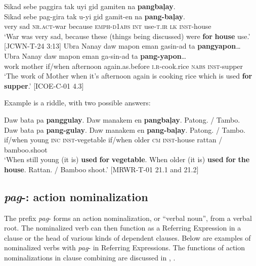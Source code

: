 \largerpage
\ea
Sikad  sebe  paggira  tak  uyi  gid  gamiten  na  \textbf{pangbaļay}. \\\smallskip
 \gll Sikad  sebe  pag-gira  tak  u-yi  gid  gamit-en  na  \textbf{pang-baļay}. \\
very  sad  \textsc{nr.act}-war  because  \textsc{emph}-\textsc{d}1\textsc{abs}  \textsc{int}  use-\textsc{t.ir}  \textsc{lk}  \textsc{inst}-house \\
\glt ‘War was very sad, because these (things being discussed) were \textbf{for} \textbf{house} use.’ [JCWN-T-24 3:13]
\z
\ea
Ubra  Nanay  daw  mapon  eman  gasin-ad ta  \textbf{pangyapon}… \\\smallskip
 \gll Ubra  Nanay  daw  mapon  eman  ga-sin-ad ta  \textbf{pang-yapon}… \\
work  mother  if/when  afternoon  again.as.before  \textsc{i.r}-cook.rice \textsc{nabs}  \textsc{inst}-supper \\
\glt `The work of Mother when it’s afternoon again is cooking rice which is used \textbf{for} \textbf{supper}.’ [ICOE-C-01 4.3]
\z

Example  is a riddle, with two possible answers:

\ea
\label{bkm:Ref447638230}
Daw  bata  pa  \textbf{panggulay}.  Daw  manakem  en  \textbf{pangbaļay}. Patong. /   Tambo. \\\smallskip
 \gll Daw  bata  pa  \textbf{pang-gulay}.  Daw  manakem  en  \textbf{pang-baļay}. Patong. /   Tambo. \\
if/when  young  \textsc{inc}  \textsc{inst}-vegetable  if/when  older  \textsc{cm}  \textsc{inst}-house rattan / bamboo.shoot \\
\glt `When still young (it is) \textbf{used} \textbf{for} \textbf{vegetable}. When older (it is) \textbf{used} \textbf{for} \textbf{the} \textbf{house}. Rattan. / Bamboo shoot.’ [MRWR-T-01 21.1 and 21.2]
\z

\subsection{\textit{pag}-: action nominalization}
\label{sec:pag}

The prefix \textit{pag}{}- forms an action nominalization, or “verbal noun”, from a verbal root. The nominalized verb can then function as a Referring Expression in a clause or the head of various kinds of dependent clauses. Below are examples of nominalized verbs with \textit{pag}{}- in Referring Expressions. The functions of action nominalizations in clause combining are discussed in , .

